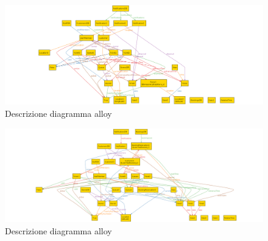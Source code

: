 \begin{figure} [H]
	\includegraphics[width=\linewidth]{../Alloy/temporaryStopStore.png}
	\caption{Descrizione diagramma alloy}
	\label{fig:AlloyTag10}
\end{figure}

\begin{figure} [H]
	\includegraphics[width=\linewidth]{../Alloy/userHasBooked.png}
	\caption{Descrizione diagramma alloy}
	\label{fig:AlloyTag11}
\end{figure}


